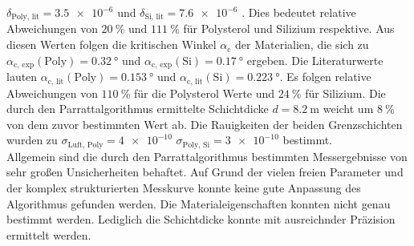 $\delta_\text{Poly, lit} = \num{3.5e-6}$ und $\delta_\text{Si, lit} = \num{7.6e-6}$ \cite{V44}. Dies bedeutet relative Abweichungen von $\qty{20}{\percent}$ und 
$\qty{111}{\percent}$ für Polysterol und Silizium respektive. Aus diesen Werten folgen die kritischen Winkel $\alpha_\text{c}$ der Materialien, die sich zu 
$\alpha_\text{c, exp}(\text{Poly}) =\qty{0.32}{\degree}$ und $\alpha_\text{c, exp}(\text{Si}) = \qty{0.17}{\degree}$ ergeben. Die Literaturwerte lauten 
$\alpha_\text{c, lit}(\text{Poly}) =\qty{0.153}{\degree}$ und $\alpha_\text{c, lit}(\text{Si}) =\qty{0.223}{\degree}$. Es folgen relative Abweichungen von $\qty{110}{\percent}$
für die Polysterol Werte und  $\qty{24}{\percent}$ für Silizium. Die durch den Parrattalgorithmus ermittelte Schichtdicke $d = \qty{8.2}{\metre}$ weicht um 
$\qty{8}{\percent}$ von dem zuvor bestimmten Wert ab. 
Die Rauigkeiten der beiden Grenzschichten wurden zu $\sigma_\text{Luft, Poly} = \num{4e-10}$ $\sigma_\text{Poly, Si} = \num{3e-10}$ bestimmt. \\
Allgemein sind die durch den Parrattalgorithmus bestimmten Messergebnisse von sehr großen Unsicherheiten behaftet.
Auf Grund der vielen freien Parameter und der komplex strukturierten Messkurve konnte keine gute Anpassung des Algorithmus gefunden werden.
Die Materialeigenschaften konnten nicht genau bestimmt werden. Lediglich die Schichtdicke konnte mit ausreichnder Präzision ermittelt werden. 
